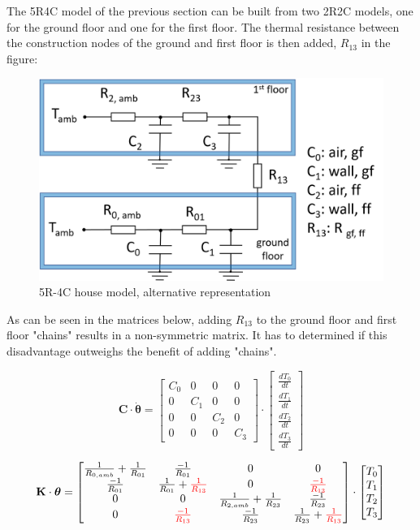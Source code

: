 The 5R4C model of the previous section can be built from two 2R2C models, one for the ground floor and one for the first floor. The thermal resistance between the construction nodes of the ground and first floor is then added, $R_{13}$ in the figure:
 
\begin{figure}[H]
	\centering
	\includegraphics[width=0.6\columnwidth]{Figures/5R4C_alternative.png}
	\caption[Short title]{5R-4C house model, alternative representation}
	\label{fig:alt5R4C}
\end{figure}

As can be seen in the matrices below, adding $R_{13}$ to the ground floor and first floor "chains" results in a non-symmetric matrix. It has to determined if this disadvantage outweighs the benefit of adding "chains".

\begin{equation}
	\mathbf{C} \cdot \boldsymbol{\dot{\theta}} =
	\begin{bmatrix}
		C_{0} & 0 & 0 & 0\\
		0 &  C_{1} & 0 & 0 \\
		0 & 0 & C_{2} & 0\\
		0 & 0 & 0 & C_{3}
	\end{bmatrix}
	\cdot
	\begin{bmatrix}
		\frac{dT_{0}}{dt} \\
		\frac{dT_{1}}{dt} \\
		\frac{dT_{2}}{dt} \\
		\frac{dT_{3}}{dt} 
	\end{bmatrix}
\end{equation}

\begin{equation}
	\mathbf{K} \cdot \boldsymbol{\theta} =
	\begin{bmatrix}
		\frac{1}{R_{0, amb}} + \frac{1}{R_{01}} & \frac{-1}{R_{01}} & 0 & 0 \\
		\frac{-1}{R_{01}} &  \frac{1}{R_{01}} + \color{red} \frac{1}{R_{13}} & 0 & \color{red} \frac{-1}{R_{13}} \\
		0 & 0 & \frac{1}{R_{2, amb}} + \frac{1}{R_{23}} & \frac{-1}{R_{23}} \\
		0 & \color{red}\frac{-1}{R_{13}} & \frac{-1}{R_{23}}  & \frac{1}{R_{23}} + \color{red}\frac{1}{R_{13}}
	\end{bmatrix}
	\cdot
	\begin{bmatrix}
		T_{0} \\
		T_{1} \\
		T_{2} \\
		T_{3}
	\end{bmatrix}
\end{equation}

